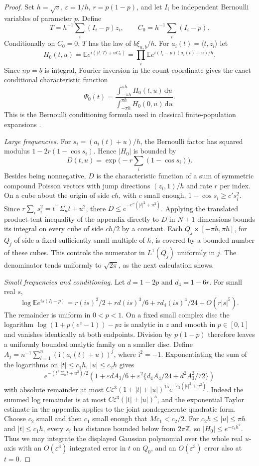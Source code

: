 \documentclass[10pt,letterpaper]{article}
\newcommand{\E}{\mathbb E}
\newcommand{\ip}[2]{\langle #1,#2\rangle}
\newcommand{\eps}{\varepsilon}
\newcommand{\dd}{\,\mathrm d}
\begin{document}
\begin{proof}
Set $h=\sqrt v$, $\eps=1/h$, $r=p(1-p)$, and let $I_i$ be independent Bernoulli variables of parameter $p$. Define
\[
 T=h^{-1}\sum_i(I_i-p)z_i,\qquad C_0=h^{-1}\sum_i(I_i-p).
\]
Conditionally on $C_0=0$, $T$ has the law of $b\xi_{n,b}/h$. For $a_i(t)=\ip t{z_i}$ let
\[
 H_0(t,u)=\E e^{i(\ip tT+uC_0)}
 =\prod_i \E e^{i(I_i-p)(a_i(t)+u)/h}.
\]
Since $np=b$ is integral, Fourier inversion in the count coordinate gives the exact conditional characteristic function
\[
 \Psi_0(t)=
 \frac{\int_{-\pi h}^{\pi h} H_0(t,u)\dd u}
      {\int_{-\pi h}^{\pi h} H_0(0,u)\dd u}.
\]
This is the Bernoulli conditioning formula used in classical finite-population expansions \cite{bs}.

\emph{Large frequencies.}
For $s_i=(a_i(t)+u)/h$, the Bernoulli factor has squared modulus $1-2r(1-\cos s_i)$. Hence $|H_0|$ is bounded by
\[
 D(t,u)=\exp\bigl(-r\textstyle\sum_i(1-\cos s_i)\bigr).
\]
Besides being nonnegative, $D$ is the characteristic function of a sum of symmetric compound Poisson vectors with jump directions $(z_i,1)/h$ and rate $r$ per index. On a cube about the origin of side $c h$, with $c$ small enough, $1-\cos s_i\ge c' s_i^2$. Since $r\sum_i s_i^2=t^\top\Sigma_n t+u^2$, there $D\le e^{-c''(|t|^2+u^2)}$. Applying the translated product-tent inequality of the appendix directly to $D$ in $N+1$ dimensions bounds its integral on every cube of side $c h/2$ by a constant. Each $Q_j\times[-\pi h,\pi h]$, for $Q_j$ of side a fixed sufficiently small multiple of $h$, is covered by a bounded number of these cubes. This controls the numerator in $L^1(Q_j)$ uniformly in $j$. The denominator tends uniformly to $\sqrt{2\pi}$, as the next calculation shows.

\emph{Small frequencies and conditioning.}
Let $d=1-2p$ and $d_4=1-6r$. For small real $s$,
\[
 \log\E e^{is(I_i-p)}
 =r(is)^2/2+r d(is)^3/6+r d_4(is)^4/24+O(r|s|^5).
\]
The remainder is uniform in $0<p<1$. On a fixed small complex disc the logarithm $\log(1+p(e^z-1))-pz$ is analytic in $z$ and smooth in $p\in[0,1]$ and vanishes identically at both endpoints. Division by $p(1-p)$ therefore leaves a uniformly bounded analytic family on a smaller disc. Define $A_j=n^{-1}\sum_{l=1}^n(\mathrm{i}(a_l(t)+u))^j$, where $\mathrm{i}^2=-1$. Exponentiating the sum of the logarithms on $|t|\le c_1 h$, $|u|\le c_2 h$ gives
\[
 e^{-(t^\top\Sigma_n t+u^2)/2}
 \left(1+\eps d A_3/6+\eps^2\{d_4 A_4/24+d^2 A_3^2/72\}\right)
\]
with absolute remainder at most
$C\eps^3(1+|t|+|u|)^{15}e^{-c_3(|t|^2+u^2)}$. Indeed the summed log remainder is at most $C\eps^3(|t|+|u|)^5$, and the exponential Taylor estimate in the appendix applies to the joint nondegenerate quadratic form. Choose $c_2$ small and then $c_1$ small enough that $M c_1<c_2/2$. For $c_2 h\le |u|\le\pi h$ and $|t|\le c_1h$, every $s_i$ has distance bounded below from $2\pi\mathbb Z$, so $|H_0|\le e^{-c_4h^2}$. Thus we may integrate the displayed Gaussian polynomial over the whole real $u$-axis with an $O(\eps^3)$ integrated error in $t$ on $Q_0$, and an $O(\eps^3)$ error also at $t=0$.


\end{proof}
\end{document}
